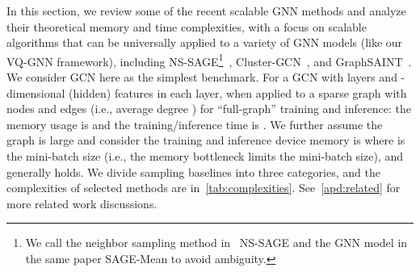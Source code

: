 \documentclass{article}
\begin{document}
In this section, we review some of the recent scalable GNN methods and analyze their theoretical memory and time complexities, with a focus on scalable algorithms that can be universally applied to a variety of GNN models (like our VQ-GNN framework), including NS-SAGE\footnote{We call the neighbor sampling method in~\citep{hamilton2017inductive} NS-SAGE and the GNN model in the same paper SAGE-Mean to avoid ambiguity.}~\citep{hamilton2017inductive}, Cluster-GCN~\citep{chiang2019cluster}, and GraphSAINT~\citep{zeng2019graphsaint}. We consider GCN here as the simplest benchmark. For a GCN with  layers and -dimensional (hidden) features in each layer, when applied to a sparse graph with  nodes and  edges (i.e., average degree ) for ``full-graph'' training and inference: the memory usage is  and the training/inference time is . We further assume the graph is large and consider the training and inference device memory is  where  is the mini-batch size (i.e., the memory bottleneck limits the mini-batch size), and generally  holds. We divide sampling baselines into three categories, and the complexities of selected methods are in~\cref{tab:complexities}. See~\cref{apd:related} for more related work discussions.



\begin{table}[t]
\centering
\caption{\label{tab:complexities}Memory and time complexities of sampling-based methods and our approach; see~\cref{sec:related} for details.}
\vspace{-5pt}
\end{table}
\end{document}

